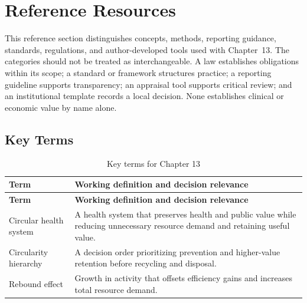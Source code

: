 \section{Reference Resources}
\label{sec:comp-ch13-reference}

This reference section distinguishes concepts, methods, reporting guidance,
standards, regulations, and author-developed tools used with Chapter~13. The
categories should not be treated as interchangeable. A law establishes obligations
within its scope; a standard or framework structures practice; a reporting guideline
supports transparency; an appraisal tool supports critical review; and an
institutional template records a local decision. None establishes clinical or
economic value by name alone. 

\subsection{Key Terms}
\begin{longtable}{@{}p{}p{}@{}}
\caption{Key terms for Chapter 13}
\label{tab:comp-ch13-key-terms}\\
\toprule
\textbf{Term} & \textbf{Working definition and decision relevance} \\
\midrule
\endfirsthead
\toprule
\textbf{Term} & \textbf{Working definition and decision relevance} \\
\midrule
\endhead
\bottomrule
\endlastfoot
Circular health system & A health system that preserves health and public value while reducing unnecessary resource demand and retaining useful value. \\
Circularity hierarchy & A decision order prioritizing prevention and higher-value retention before recycling and disposal. \\
Rebound effect & Growth in activity that offsets efficiency gains and increases total resource demand. \\
\end{longtable}

